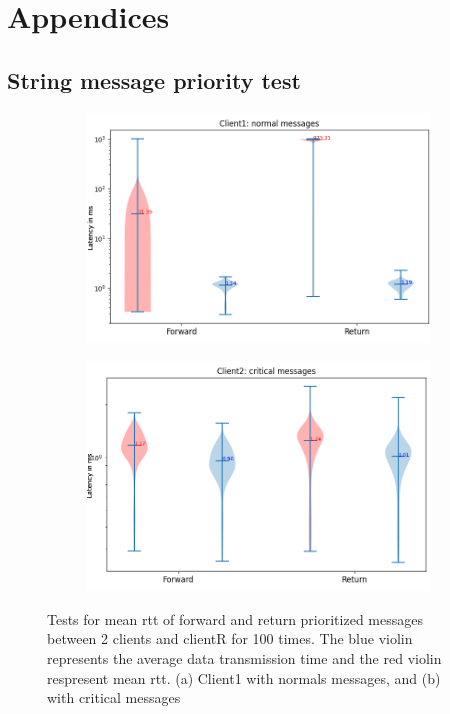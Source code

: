 \chapter{Appendices}\label{chap: append}
\section{String message priority test}%
%
%
\begin{figure}[htb]
    \centering
    \begin{subfigure}[b]{0.99\textwidth}
    \includegraphics[width=\textwidth]{figures/appendix/priority_tests/log_violin_2clients_priority_client1.png}\hfill 
    \caption{} \label{fig: priority-2clients-1}
    \end{subfigure}
    \begin{subfigure}[b]{0.99\textwidth}
        \includegraphics[width=\textwidth]{figures/appendix/priority_tests/log_violin_2clients_priority_client2.png}\hfill 
        \caption{} \label{fig: priority-2clients-2}
    \end{subfigure}
    
    
    \caption{Tests for mean \gls{rtt} of forward and return prioritized messages between 2 clients 
    and clientR for 100 times. The blue violin represents the average data transmission time and the red violin 
    respresent mean \gls{rtt}. (a) Client1 with normals messages, and (b) 
    with critical messages} \label{fig: priority-2clients}
\end{figure}



